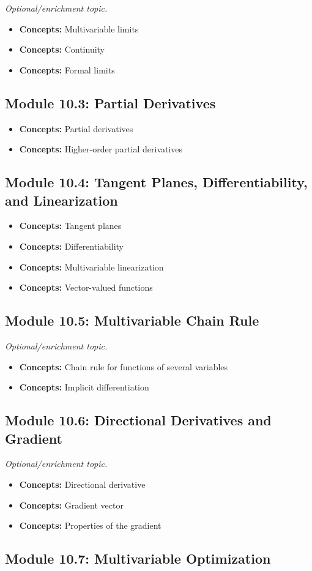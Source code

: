 \documentclass[11pt]{article}
\newcommand{\concept}[1]{\item \textbf{Concepts:} #1}
\begin{document}
\textit{Optional/enrichment topic.}

\begin{itemize}
    \concept{Multivariable limits}
    \concept{Continuity}
    \concept{Formal limits}
\end{itemize}

\subsection{Module 10.3: Partial Derivatives}

\begin{itemize}
    \concept{Partial derivatives}
    \concept{Higher-order partial derivatives}
\end{itemize}

\subsection{Module 10.4: Tangent Planes, Differentiability, and Linearization}

\begin{itemize}
    \concept{Tangent planes}
    \concept{Differentiability}
    \concept{Multivariable linearization}
    \concept{Vector-valued functions}
\end{itemize}

\subsection{Module 10.5: Multivariable Chain Rule}

\textit{Optional/enrichment topic.}

\begin{itemize}
    \concept{Chain rule for functions of several variables}
    \concept{Implicit differentiation}
\end{itemize}

\subsection{Module 10.6: Directional Derivatives and Gradient}

\textit{Optional/enrichment topic.}

\begin{itemize}
    \concept{Directional derivative}
    \concept{Gradient vector}
    \concept{Properties of the gradient}
\end{itemize}

\subsection{Module 10.7: Multivariable Optimization}
\end{document}
